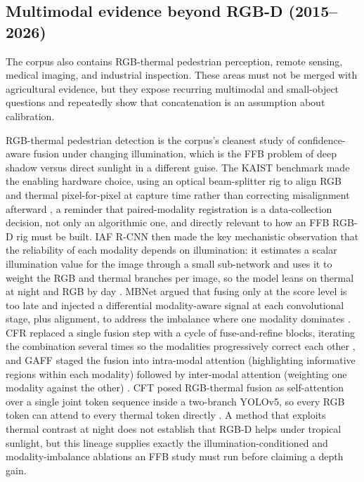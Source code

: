 \subsection{Multimodal evidence beyond RGB-D (2015--2026)}

The corpus also contains RGB-thermal pedestrian perception, remote sensing, medical imaging, and industrial inspection. These areas must not be merged with agricultural evidence, but they expose recurring multimodal and small-object questions and repeatedly show that concatenation is an assumption about calibration.

RGB-thermal pedestrian detection is the corpus's cleanest study of confidence-aware fusion under changing illumination, which is the FFB problem of deep shadow versus direct sunlight in a different guise. The KAIST benchmark made the enabling hardware choice, using an optical beam-splitter rig to align RGB and thermal pixel-for-pixel at capture time rather than correcting misalignment afterward \cite{hwang2015kaist}, a reminder that paired-modality registration is a data-collection decision, not only an algorithmic one, and directly relevant to how an FFB RGB-D rig must be built. IAF R-CNN then made the key mechanistic observation that the reliability of each modality depends on illumination: it estimates a scalar illumination value for the image through a small sub-network and uses it to weight the RGB and thermal branches per image, so the model leans on thermal at night and RGB by day \cite{li2019illumination}. MBNet argued that fusing only at the score level is too late and injected a differential modality-aware signal at each convolutional stage, plus alignment, to address the imbalance where one modality dominates \cite{zhou2020mbnet}. CFR replaced a single fusion step with a cycle of fuse-and-refine blocks, iterating the combination several times so the modalities progressively correct each other \cite{zhang2020cfr}, and GAFF staged the fusion into intra-modal attention (highlighting informative regions within each modality) followed by inter-modal attention (weighting one modality against the other) \cite{zhang2021gaff}. CFT posed RGB-thermal fusion as self-attention over a single joint token sequence inside a two-branch YOLOv5, so every RGB token can attend to every thermal token directly \cite{fang2022cft}. A method that exploits thermal contrast at night does not establish that RGB-D helps under tropical sunlight, but this lineage supplies exactly the illumination-conditioned and modality-imbalance ablations an FFB study must run before claiming a depth gain.

